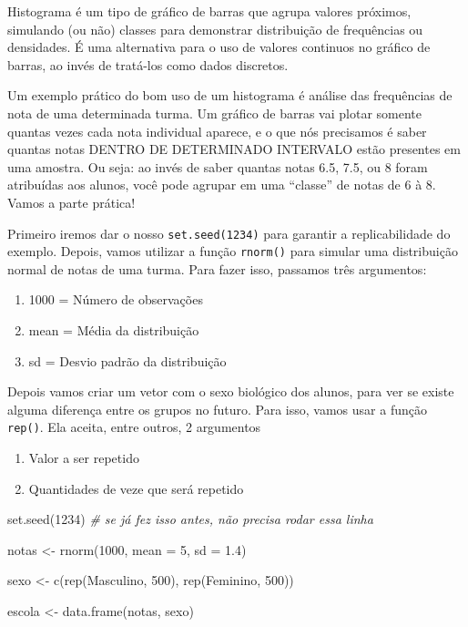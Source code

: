 \documentclass[
]{book}
\newenvironment{Shaded}{\begin{snugshade}}{\end{snugshade}}
\newcommand{\AttributeTok}[1]{\textcolor[rgb]{0.77,0.63,0.00}{#1}}
\newcommand{\CommentTok}[1]{\textcolor[rgb]{0.56,0.35,0.01}{\textit{#1}}}
\newcommand{\DecValTok}[1]{\textcolor[rgb]{0.00,0.00,0.81}{#1}}
\newcommand{\FloatTok}[1]{\textcolor[rgb]{0.00,0.00,0.81}{#1}}
\newcommand{\FunctionTok}[1]{\textcolor[rgb]{0.00,0.00,0.00}{#1}}
\newcommand{\NormalTok}[1]{#1}
\newcommand{\OtherTok}[1]{\textcolor[rgb]{0.56,0.35,0.01}{#1}}
\newcommand{\StringTok}[1]{\textcolor[rgb]{0.31,0.60,0.02}{#1}}
\providecommand{\tightlist}{%
  \setlength{\itemsep}{0pt}\setlength{\parskip}{0pt}}
\begin{document}
Histograma é um tipo de gráfico de barras que agrupa valores próximos, simulando (ou não) classes para demonstrar distribuição de frequências ou densidades. É uma alternativa para o uso de valores continuos no gráfico de barras, ao invés de tratá-los como dados discretos.

Um exemplo prático do bom uso de um histograma é análise das frequências de nota de uma determinada turma. Um gráfico de barras vai plotar somente quantas vezes cada nota individual aparece, e o que nós precisamos é saber quantas notas DENTRO DE DETERMINADO INTERVALO estão presentes em uma amostra. Ou seja: ao invés de saber quantas notas 6.5, 7.5, ou 8 foram atribuídas aos alunos, você pode agrupar em uma ``classe'' de notas de 6 à 8. Vamos a parte prática!

Primeiro iremos dar o nosso \texttt{set.seed(1234)} para garantir a replicabilidade do exemplo. Depois, vamos utilizar a função \texttt{rnorm()} para simular uma distribuição normal de notas de uma turma. Para fazer isso, passamos três argumentos:

\begin{enumerate}
\def\labelenumi{\arabic{enumi}.}
\tightlist
\item
  1000 = Número de observações
\item
  mean = Média da distribuição
\item
  sd = Desvio padrão da distribuição
\end{enumerate}

Depois vamos criar um vetor com o sexo biológico dos alunos, para ver se existe alguma diferença entre os grupos no futuro. Para isso, vamos usar a função \texttt{rep()}. Ela aceita, entre outros, 2 argumentos

\begin{enumerate}
\def\labelenumi{\arabic{enumi}.}
\tightlist
\item
  Valor a ser repetido
\item
  Quantidades de veze que será repetido
\end{enumerate}

\begin{Shaded}
\begin{Highlighting}[]
\FunctionTok{set.seed}\NormalTok{(}\DecValTok{1234}\NormalTok{) }\CommentTok{\# se já fez isso antes, não precisa rodar essa linha}

\NormalTok{notas }\OtherTok{\textless{}{-}} \FunctionTok{rnorm}\NormalTok{(}\DecValTok{1000}\NormalTok{, }\AttributeTok{mean =} \DecValTok{5}\NormalTok{, }\AttributeTok{sd =} \FloatTok{1.4}\NormalTok{) }

\NormalTok{sexo }\OtherTok{\textless{}{-}} \FunctionTok{c}\NormalTok{(}\FunctionTok{rep}\NormalTok{(}\StringTok{\textquotesingle{}Masculino\textquotesingle{}}\NormalTok{, }\DecValTok{500}\NormalTok{), }\FunctionTok{rep}\NormalTok{(}\StringTok{\textquotesingle{}Feminino\textquotesingle{}}\NormalTok{, }\DecValTok{500}\NormalTok{))}

\NormalTok{escola }\OtherTok{\textless{}{-}} \FunctionTok{data.frame}\NormalTok{(notas, sexo)}
\end{Highlighting}
\end{Shaded}
\end{document}
